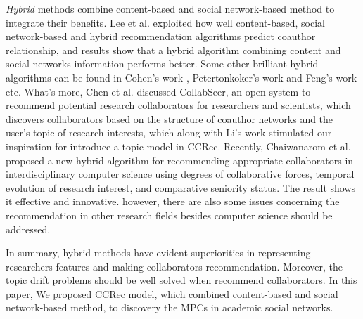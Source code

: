 \documentclass[10pt]{article}
\begin{document}
\emph{Hybrid} methods combine content-based and social network-based method to integrate their benefits. Lee et al. \cite{lee2011recommending} exploited how well content-based, social network-based and hybrid recommendation algorithms predict coauthor relationship, and results show that a hybrid algorithm combining content and social networks information performs better. Some other brilliant hybrid algorithms can be found in Cohen's work \cite{cohen2013recommending}, Petertonkoker's work \cite{petertonkoker2014scientific} and Feng's work \cite{xia2014socially} etc. What's more, Chen et al. \cite{chen2011collabseer} discussed CollabSeer, an open system to recommend potential research collaborators for researchers and scientists, which discovers collaborators based on the structure of coauthor networks and the user's topic of research interests, which along with Li's work \cite{li2014author} stimulated our inspiration for introduce a topic model in CCRec. Recently, Chaiwanarom et al. \cite{chaiwanarom2014collaborator} proposed a new hybrid algorithm for recommending appropriate collaborators in interdisciplinary computer science using degrees of collaborative forces, temporal evolution of research interest, and comparative seniority status. The result shows it effective and innovative. however, there are also some issues concerning the recommendation in other research fields besides computer science should be addressed.

In summary, hybrid methods have evident superiorities in representing researchers features and making collaborators recommendation. Moreover, the topic drift problems should be well solved when recommend collaborators. In this paper, We proposed CCRec model, which combined content-based and social network-based method, to discovery the MPCs in academic social networks.

\end{document}
